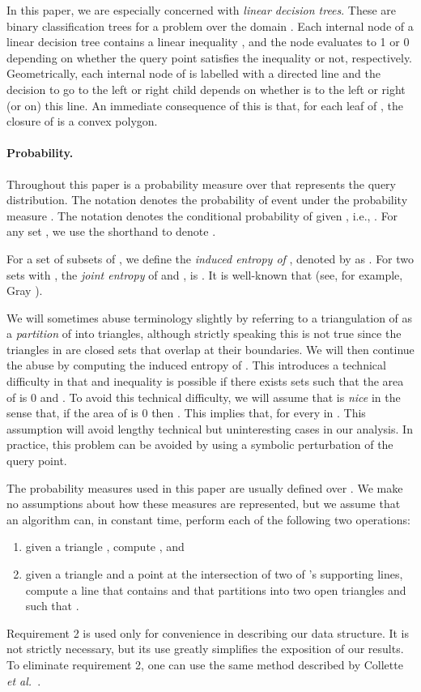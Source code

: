 \documentclass[lotsofwhite]{patmorin}
\newcommand{\etal}{\emph{et al.}}
\begin{document}
In this paper, we are especially concerned with \emph{linear decision
trees}. These are binary classification trees for a problem
 over the domain .  Each internal node  of a
linear decision tree contains a linear inequality , and the node evaluates to 1 or 0 depending on whether the query
point  satisfies the inequality or not, respectively.
Geometrically, each internal node of  is labelled with a directed
line and the decision to go to the left or right child depends on
whether  is to the left or right (or on) this line.  An immediate
consequence of this is that, for each leaf  of , the closure
of  is a convex polygon. 

\paragraph{Probability.}

Throughout this paper  is a probability measure over  that
represents the query distribution.  The notation  denotes the
probability of event  under the probability measure .  The
notation  denotes the conditional probability of  given
, i.e., .  For any set , we use
the shorthand  to denote .

For a set  of subsets of , we define the \emph{induced
entropy of }, denoted by  as .  For two sets  with
, the \emph{joint entropy} of  and , is
.  It is well-known that  (see, for example, Gray \cite[Lemma~2.3.2]{g08}).

We will sometimes abuse terminology slightly by referring to a
triangulation  of  as a \emph{partition} of  into
triangles, although strictly speaking this is not true since the
triangles in  are closed sets that overlap at their
boundaries.  We will then continue the abuse by computing the induced 
entropy of .
This introduces a technical difficulty in that
 and inequality is possible if there
exists sets  such that the area of  is 0 and
.  To avoid this technical difficulty, we will assume that
 is \emph{nice} in the sense that, if the area of  is 0 then
.   This implies that, for every  in  .  This assumption will avoid lengthy technical but
uninteresting cases in our analysis.  In practice, this problem can
be avoided by using a symbolic perturbation of the query point.

The probability measures used in this paper are usually defined over
.  We make no assumptions about how these measures are
represented, but we assume that an algorithm can, in constant time,
perform each of the following two operations:
\begin{enumerate}
\item given a triangle , compute , and
\item given a triangle  and a point  at the
intersection of two of 's supporting lines, compute a line 
that contains  and that partitions  into two open triangles
 and  such that .
\end{enumerate}
Requirement 2 is used only for convenience in describing our data
structure.  It is not strictly necessary, but its use greatly
simplifies the exposition of our results.  To eliminate requirement 2,
one can use the same method described by Collette \etal\
\cite[Section~5]{cdilm08}.
\end{document}

